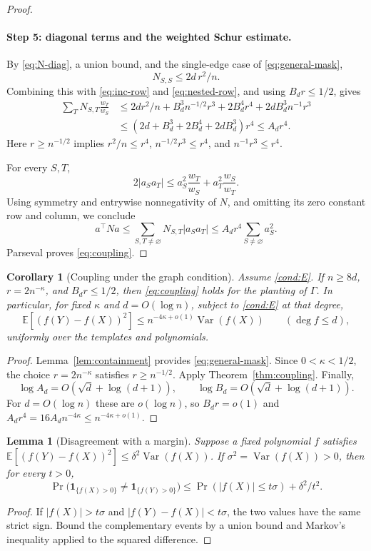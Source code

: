 \documentclass[11pt]{article}
\newcommand{\E}{\mathbb E}
\newcommand{\Var}{\operatorname{Var}}
\newcommand{\1}{\mathbf 1}
\newtheorem{lemma}[theorem]{Lemma}
\newtheorem{corollary}[theorem]{Corollary}
\theoremstyle{definition}
\theoremstyle{remark}
\numberwithin{equation}{section}
\begin{document}
\begin{proof}
\paragraph{Step 5: diagonal terms and the weighted Schur estimate.}
By \eqref{eq:N-diag}, a union bound, and the single-edge case of \eqref{eq:general-mask},
\[
 N_{S,S}\le2d\,r^2/n.
\]
Combining this with \eqref{eq:inc-row} and \eqref{eq:nested-row}, and using $B_dr\le1/2$, gives
\begin{align*}
 \sum_TN_{S,T}\frac{w_T}{w_S}
 &\le2dr^2/n+B_d^3n^{-1/2}r^3
       +2B_d^4r^4+2dB_d^3n^{-1}r^3\\
 &\le(2d+B_d^3+2B_d^4+2dB_d^3)r^4
 \le A_dr^4.
\end{align*}
Here $r\ge n^{-1/2}$ implies $r^2/n\le r^4$, $n^{-1/2}r^3\le r^4$, and $n^{-1}r^3\le r^4$.

For every $S,T$,
\[
 2|a_Sa_T|\le a_S^2\frac{w_T}{w_S}+a_T^2\frac{w_S}{w_T}.
\]
Using symmetry and entrywise nonnegativity of $N$, and omitting its zero constant row and column, we conclude
\[
 a^\top Na\le\sum_{S,T\ne\varnothing}N_{S,T}|a_Sa_T|
 \le A_dr^4\sum_{S\ne\varnothing}a_S^2.
\]
Parseval proves \eqref{eq:coupling}.
\end{proof}

\begin{corollary}[Coupling under the graph condition]\label{cor:graph-coupling}
Assume \eqref{cond:E}. If $n\ge8d$, $r=2n^{-\kappa}$, and $B_dr\le1/2$, then \eqref{eq:coupling} holds for the planting of $\Gamma$. In particular, for fixed $\kappa$ and $d=O(\log n)$, subject to \eqref{cond:E} at that degree,
\[
\E[(f(Y)-f(X))^2]
 \le n^{-4\kappa+o(1)}\Var(f(X))
 \qquad(\deg f\le d),
\]
uniformly over the templates and polynomials.
\end{corollary}
\begin{proof}
Lemma~\ref{lem:containment} provides \eqref{eq:general-mask}. Since $0<\kappa<1/2$, the choice $r=2n^{-\kappa}$ satisfies $r\ge n^{-1/2}$. Apply Theorem~\ref{thm:coupling}. Finally,
\[
 \log A_d=O(\sqrt d+\log(d+1)),\qquad
 \log B_d=O(\sqrt d+\log(d+1)).
\]
For $d=O(\log n)$ these are $o(\log n)$, so $B_dr=o(1)$ and $A_dr^4=16A_dn^{-4\kappa}\le n^{-4\kappa+o(1)}$.
\end{proof}

\begin{lemma}[Disagreement with a margin]\label{lem:margin}
Suppose a fixed polynomial $f$ satisfies
$\E[(f(Y)-f(X))^2]\le\delta^2\Var(f(X))$.
If $\sigma^2=\Var(f(X))>0$, then for every $t>0$,
\[
\Pr\bigl(\1_{\{f(X)>0\}}\ne\1_{\{f(Y)>0\}}\bigr)
 \le\Pr(|f(X)|\le t\sigma)+\delta^2/t^2.
\]
\end{lemma}
\begin{proof}
If $|f(X)|>t\sigma$ and $|f(Y)-f(X)|<t\sigma$, the two values have the same strict sign. Bound the complementary events by a union bound and Markov's inequality applied to the squared difference.
\end{proof}
\end{document}
